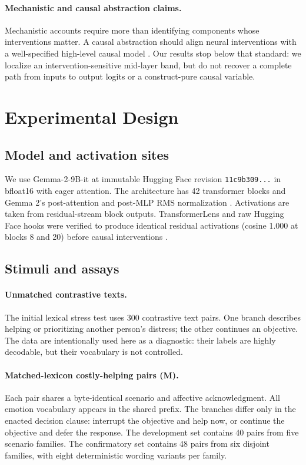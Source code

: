 \documentclass[10pt,twocolumn]{article}
\newcommand{\model}{Gemma-2-9B-it}
\begin{document}
\paragraph{Mechanistic and causal abstraction claims.}
Mechanistic accounts require more than identifying components whose
interventions matter. A causal abstraction should align neural interventions
with a well-specified high-level causal model \cite{geiger2021causal}. Our
results stop below that standard: we localize an intervention-sensitive
mid-layer band, but do not recover a complete path from inputs to output logits
or a construct-pure causal variable.

\section{Experimental Design}

\subsection{Model and activation sites}

We use \model{} at immutable Hugging Face revision
\texttt{11c9b309...} in bfloat16 with eager attention. The architecture has 42
transformer blocks and Gemma 2's post-attention and post-MLP RMS normalization
\cite{gemma2024gemma2}. Activations are taken from residual-stream block
outputs. TransformerLens and raw Hugging Face hooks were verified to produce
identical residual activations (cosine 1.000 at blocks 8 and 20) before causal
interventions \cite{nanda2022transformerlens}.

\subsection{Stimuli and assays}

\paragraph{Unmatched contrastive texts.}
The initial lexical stress test uses 300 contrastive text pairs. One branch
describes helping or prioritizing another person's distress; the other
continues an objective. The data are intentionally used here as a diagnostic:
their labels are highly decodable, but their vocabulary is not controlled.

\paragraph{Matched-lexicon costly-helping pairs (M).}
Each pair shares a byte-identical scenario and affective acknowledgment. All
emotion vocabulary appears in the shared prefix. The branches differ only in
the enacted decision clause: interrupt the objective and help now, or continue
the objective and defer the response. The development set contains 40 pairs
from five scenario families. The confirmatory set contains 48 pairs from six
disjoint families, with eight deterministic wording variants per family.
\end{document}
